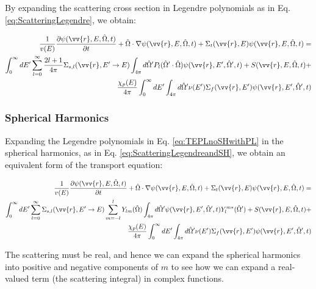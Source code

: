 \documentclass[10pt]{article}
\begin{document}
\begin{flushleft}
By expanding the scattering cross section in Legendre polynomials as in Eq. \ref{eq:ScatteringLegendre}, we obtain:

\begin{equation}
\label{eq:TEPLnoSHwithPL}
\begin{aligned}
\frac{1}{v(E)} \frac{\partial\psi(\vv{r}, E, \hat{\Omega},t)}{\partial t} +
 \hat{\Omega}\cdot\nabla\psi(\vv{r}, E, \hat{\Omega},t) + 
 \Sigma_t(\vv{r},E)\psi(\vv{r}, E, \hat{\Omega},t) = \\
 \int_{0}^{\infty}dE' \sum_{l=0}^{\infty} \frac{2l+1}{4\pi}\Sigma_{s,l}(\vv{r}, E'\rightarrow E) \int_{4\pi}^{} d\hat{\Omega}'P_l(\hat{\Omega}'\cdot\hat{\Omega})\psi(\vv{r}, E', \hat{\Omega}', t) + S(\vv{r}, E, \hat{\Omega},t)+\\
  \frac{\chi_p(E)}{4\pi} \int_{0}^{\infty} dE'\int_{4\pi}^{} d\hat{\Omega}'\nu(E')\Sigma_f(\vv{r}, E')\psi(\vv{r}, E', \hat{\Omega}',t)\\
\end{aligned}
\end{equation}

\subsubsection{Spherical Harmonics}

Expanding the Legendre polynomials in Eq. \eqref{eq:TEPLnoSHwithPL} in the spherical harmonics, as in Eq. \ref{eq:ScatteringLegendreandSH}, we obtain an equivalent form of the transport equation:

\begin{equation}
\label{eq:TEPLnomoments}
\begin{aligned}
\frac{1}{v(E)} \frac{\partial\psi(\vv{r}, E, \hat{\Omega},t)}{\partial t} +
 \hat{\Omega}\cdot\nabla\psi(\vv{r}, E, \hat{\Omega},t) + 
 \Sigma_t(\vv{r},E)\psi(\vv{r}, E, \hat{\Omega},t) = \\
 \int_{0}^{\infty}dE' \sum_{l=0}^{\infty} \Sigma_{s,l}(\vv{r}, E'\rightarrow E) \sum_{m=-l}^{l} Y_{lm}(\hat{\Omega})\int_{4\pi}^{} d\hat{\Omega}'\psi(\vv{r}, E', \hat{\Omega}', t)Y_l^{m*}(\hat{\Omega}') + S(\vv{r}, E, \hat{\Omega},t)+\\
 \frac{\chi_p(E)}{4\pi} \int_{0}^{\infty} dE'\int_{4\pi}^{} d\hat{\Omega}'\nu(E')\Sigma_f(\vv{r}, E')\psi(\vv{r}, E', \hat{\Omega}',t)\\
\end{aligned}
\end{equation}

The scattering must be real, and hence we can expand the spherical harmonics into positive and negative components of \(m\) to see how we can expand a real-valued term (the scattering integral) in complex functions. 


\end{flushleft}
\end{document}
